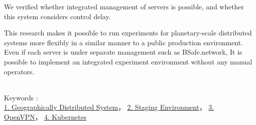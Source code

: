 We verified whether integrated management of servers is possible, and whether this system considers control delay.

This research makes it possible to run experiments for planetary-scale distributed systems more flexibly in a similar manner to a public production environment.
Even if each server is under separate management such as BSafe.network, It is possible to implement an integrated experiment environment without any manual operators.

~ \\
Keywords : \\
\underline{1. Geographically Distributed System}，
\underline{2. Staging Environment}，
\underline{3. OpenVPN}，
\underline{4. Kubernetes}
\begin{flushright}
\edept \\
\eauthor
\end{flushright}
